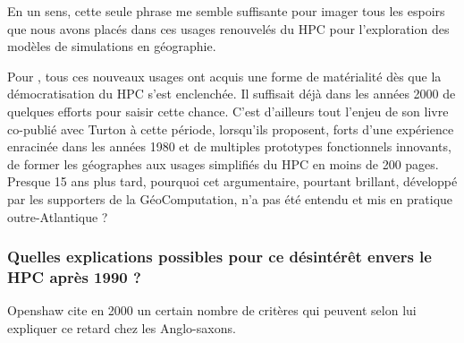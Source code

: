 En un sens, cette seule phrase me semble suffisante pour imager tous les espoirs que nous avons placés dans ces usages renouvelés du HPC pour l'exploration des modèles de simulations en géographie.

Pour \textcite{Openshaw2000}, tous ces nouveaux usages ont acquis une forme de matérialité dès que la démocratisation du HPC s'est enclenchée. Il suffisait déjà dans les années 2000 de quelques efforts pour saisir cette chance. C'est d'ailleurs tout l'enjeu de son livre co-publié avec Turton à cette période, lorsqu'ils proposent, forts d'une expérience enracinée dans les années 1980 et de multiples prototypes fonctionnels innovants, de former les géographes aux usages simplifiés du HPC en moins de 200 pages. Presque 15 ans plus tard,  pourquoi cet argumentaire, pourtant brillant, développé par les supporters de la GéoComputation, n'a pas été entendu et mis en pratique outre-Atlantique ?



\subsubsection{Quelles explications possibles pour ce désintérêt envers le HPC après 1990 ? }
\label{sssec:desertionHPC}

Openshaw cite en 2000 un certain nombre de critères qui peuvent selon lui expliquer ce retard chez les Anglo-saxons.

